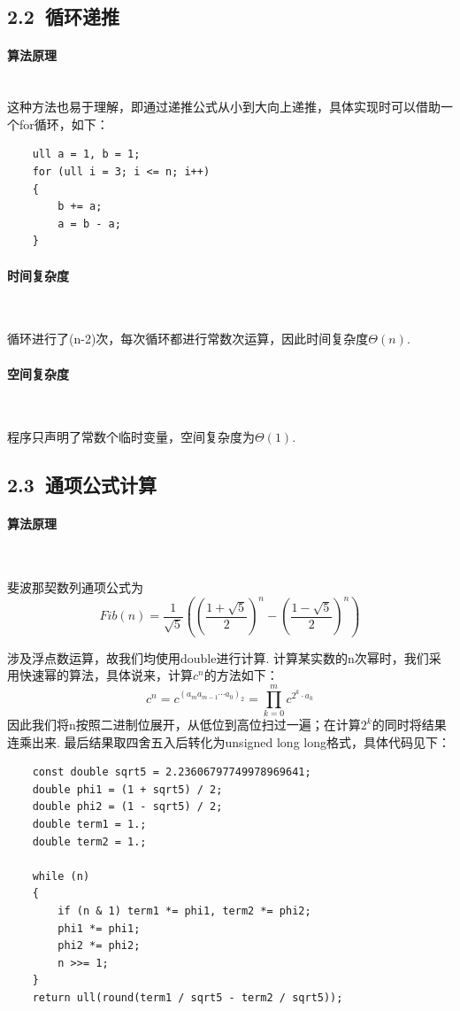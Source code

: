 \documentclass[UTF8]{ctexart}
\begin{document}
\subsection*{2.2\ 循环递推}
\paragraph{算法原理}\ \\
这种方法也易于理解，即通过递推公式从小到大向上递推，具体实现时可以借助一个for循环，如下：
\begin{lstlisting}
    ull a = 1, b = 1;
	for (ull i = 3; i <= n; i++)
	{
		b += a;
		a = b - a;
	}
\end{lstlisting}

\paragraph{时间复杂度}\ \par
循环进行了(n-2)次，每次循环都进行常数次运算，因此时间复杂度$\Theta(n)$.
\paragraph{空间复杂度}\ \par
程序只声明了常数个临时变量，空间复杂度为$\Theta(1)$.

\subsection*{2.3\ 通项公式计算}
\paragraph{算法原理}\ \par
斐波那契数列通项公式为\begin{equation}Fib(n)=\frac{1}{\sqrt{5}}((\frac{1+\sqrt{5}}{2})^n-(\frac{1-\sqrt{5}}{2})^n)\end{equation}\par
涉及浮点数运算，故我们均使用double进行计算. 计算某实数的n次幂时，我们采用快速幂的算法，具体说来，计算$c^n$的方法如下：
\begin{equation}c^n=c^{(a_m a_{m-1}\cdots a_{0})_2}=\prod\limits_{k=0}^m{c^{2^k\cdot a_k}}\label{kuaisumi}\end{equation}
因此我们将n按照二进制位展开，从低位到高位扫过一遍；在计算$2^k$的同时将结果连乘出来. 最后结果取四舍五入后转化为unsigned long long格式，具体代码见下：
\begin{lstlisting}
	const double sqrt5 = 2.23606797749978969641;
	double phi1 = (1 + sqrt5) / 2;
	double phi2 = (1 - sqrt5) / 2;
	double term1 = 1.;
	double term2 = 1.;

	while (n)
	{
		if (n & 1) term1 *= phi1, term2 *= phi2;
		phi1 *= phi1;
		phi2 *= phi2;
		n >>= 1;
	}
	return ull(round(term1 / sqrt5 - term2 / sqrt5));
\end{lstlisting}
\end{document}
